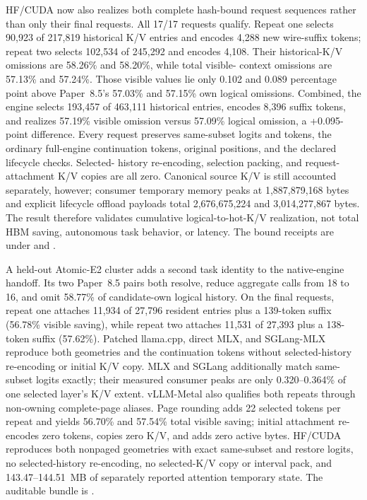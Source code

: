 \documentclass[11pt]{article}
\begin{document}
HF/CUDA now also realizes both complete hash-bound request sequences rather
than only their final requests.  All 17/17 requests qualify.  Repeat one
selects 90,923 of 217,819 historical K/V entries and encodes 4,288 new
wire-suffix tokens; repeat two selects 102,534 of 245,292 and encodes 4,108.
Their historical-K/V omissions are 58.26\% and 58.20\%, while total visible-
context omissions are 57.13\% and 57.24\%.  Those visible values lie only
0.102 and 0.089 percentage point above Paper~8.5's 57.03\% and 57.15\% own
logical omissions.  Combined, the engine selects 193,457 of 463,111 historical
entries, encodes 8,396 suffix tokens, and realizes 57.19\% visible omission
versus 57.09\% logical omission, a +0.095-point difference.  Every request
preserves same-subset logits and tokens, the ordinary full-engine continuation
tokens, original positions, and the declared lifecycle checks.  Selected-
history re-encoding, selection packing, and request-attachment K/V copies are
all zero.  Canonical source K/V is still accounted separately, however;
consumer temporary memory peaks at 1,887,879,168 bytes and explicit lifecycle
offload payloads total 2,676,675,224 and 3,014,277,867 bytes.  The result
therefore validates cumulative logical-to-hot-K/V realization, not total HBM
saving, autonomous task behavior, or latency.  The bound receipts are under
and .

A held-out Atomic-E2 cluster adds a second task identity to the native-engine
handoff.  Its two Paper~8.5 pairs both resolve, reduce aggregate calls from 18
to 16, and omit 58.77\% of candidate-own logical history.  On the final
requests, repeat one attaches 11,934 of 27,796 resident entries plus a
139-token suffix (56.78\% visible saving), while repeat two attaches 11,531 of
27,393 plus a 138-token suffix (57.62\%).  Patched llama.cpp, direct MLX, and
SGLang-MLX reproduce both geometries and the continuation tokens without
selected-history re-encoding or initial K/V copy.  MLX and SGLang additionally
match same-subset logits exactly; their measured consumer peaks are only
0.320--0.364\% of one selected layer's K/V extent.  vLLM-Metal also qualifies
both repeats through non-owning complete-page aliases.  Page rounding adds 22
selected tokens per repeat and yields 56.70\% and 57.54\% total visible saving;
initial attachment re-encodes zero tokens, copies zero K/V, and adds zero active
bytes.  HF/CUDA reproduces both nonpaged geometries with exact same-subset and
restore logits, no selected-history re-encoding, no selected-K/V copy or
interval pack, and 143.47--144.51~MB of separately reported attention
temporary state.  The auditable bundle is
.
\end{document}
